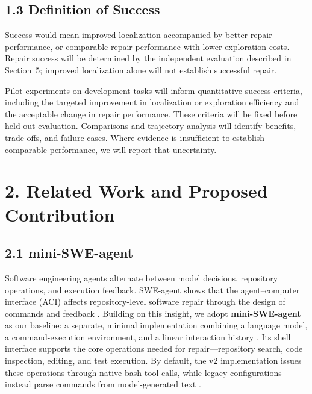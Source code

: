 \documentclass[11pt]{article}
\begin{document}
\subsection*{1.3 Definition of Success}

Success would mean improved localization accompanied by better repair
performance, or comparable repair performance with lower exploration
costs. Repair success will be determined by the independent evaluation
described in Section~5; improved localization alone will not establish
successful repair.

Pilot experiments on development tasks will inform quantitative success
criteria, including the targeted improvement in localization or
exploration efficiency and the acceptable change in repair performance.
These criteria will be fixed before held-out evaluation. Comparisons and
trajectory analysis will identify benefits, trade-offs, and failure cases.
Where evidence is insufficient to establish comparable performance, we
will report that uncertainty.


\section*{2. Related Work and Proposed Contribution}

\subsection*{2.1 mini-SWE-agent}

Software engineering agents alternate between model decisions, repository operations, and execution feedback. SWE-agent shows that the agent--computer interface (ACI) affects repository-level software repair through the design of commands and feedback \cite{yang2024sweagent}. Building on this insight, we adopt \textbf{mini-SWE-agent} as our baseline: a separate, minimal implementation combining a language model, a command-execution environment, and a linear interaction history \cite{minisweagent}. Its shell interface supports the core operations needed for repair—repository search, code inspection, editing, and test execution. By default, the v2 implementation issues these operations through native bash tool calls, while legacy configurations instead parse commands from model-generated text \cite{minisweagentv2}.
\end{document}
